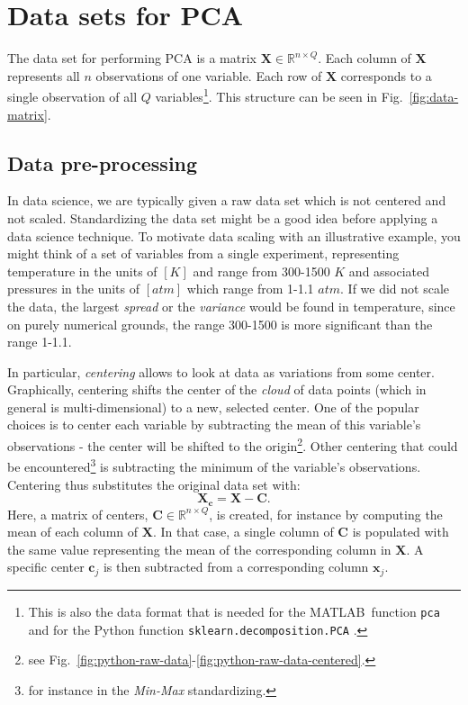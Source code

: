 \documentclass[10pt,twocolumn]{article}
\begin{document}
\section{Data sets for PCA}

The data set for performing PCA is a matrix $\mathbf{X} \in \mathbb{R}^{n \times Q}$. Each column of $\mathbf{X}$ represents all $n$ observations of one variable. Each row of $\mathbf{X}$ corresponds to a single observation of all $Q$ variables\footnote{This is also the data format that is needed for the MATLAB\textregistered \, function \texttt{pca} \cite{Matlab-pca} and for the Python function \texttt{sklearn.decomposition.PCA} \cite{Python-pca}.}. This structure can be seen in Fig.~\ref{fig:data-matrix}.

\subsection{Data pre-processing}

In data science, we are typically given a raw data set which is not centered and not scaled. Standardizing the data set might be a good idea before applying a data science technique. To motivate data scaling with an illustrative example, you might think of a set of variables from a single experiment, representing temperature in the units of $[K]$ and range from 300-1500 $K$ and associated pressures in the units of $[atm]$ which range from 1-1.1 $atm$. If we did not scale the data, the largest \textit{spread} or the \textit{variance} would be found in temperature, since on purely numerical grounds, the range 300-1500 is more significant than the range 1-1.1.

In particular, \textit{centering} allows to look at data as variations from some center. Graphically, centering shifts the center of the \textit{cloud} of data points (which in general is multi-dimensional) to a new, selected center. One of the popular choices is to center each variable by subtracting the mean of this variable's observations - the center will be shifted to the origin\footnote{see Fig.~\ref{fig:python-raw-data}-\ref{fig:python-raw-data-centered}.}.
Other centering that could be encountered\footnote{for instance in the \textit{Min-Max} standardizing.} is subtracting the minimum of the variable's observations. Centering thus substitutes the original data set with:
\begin{equation}
\mathbf{X_c} = \mathbf{X} - \mathbf{C}.
\end{equation}
Here, a matrix of centers, $\mathbf{C} \in \mathbb{R}^{n \times Q}$, is created, for instance by computing the mean of each column of $\mathbf{X}$. In that case, a single column of $\mathbf{C}$ is populated with the same value representing the mean of the corresponding column in $\mathbf{X}$. A specific center $\mathbf{c}_j$ is then subtracted from a corresponding column $\mathbf{x}_j$.
\end{document}
